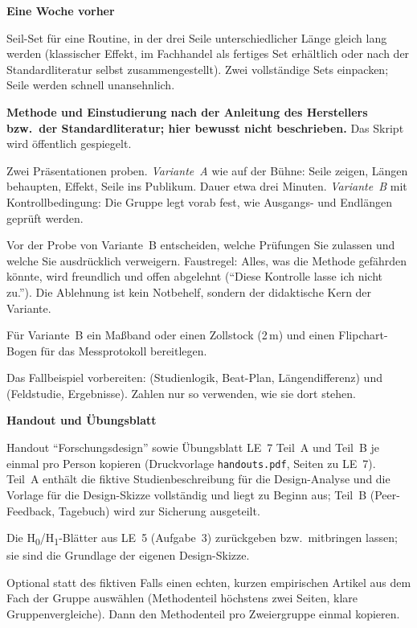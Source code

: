 \begin{vorbereitung}
\textbf{Eine Woche vorher}
\begin{checkliste}
  \item Seil-Set für eine Routine, in der drei Seile unterschiedlicher
    Länge gleich lang werden (klassischer Effekt, im Fachhandel als
    fertiges Set erhältlich oder nach der Standardliteratur selbst
    zusammengestellt). Zwei vollständige Sets einpacken; Seile werden
    schnell unansehnlich.
  \item \textbf{Methode und Einstudierung nach der Anleitung des
    Herstellers bzw.\ der Standardliteratur; hier bewusst nicht
    beschrieben.} Das Skript wird öffentlich gespiegelt.
  \item Zwei Präsentationen proben. \emph{Variante~A} wie auf der Bühne:
    Seile zeigen, Längen behaupten, Effekt, Seile ins Publikum. Dauer etwa
    drei Minuten. \emph{Variante~B} mit Kontrollbedingung: Die Gruppe legt
    vorab fest, wie Ausgangs- und Endlängen geprüft werden.
  \item Vor der Probe von Variante~B entscheiden, welche Prüfungen Sie
    zulassen und welche Sie ausdrücklich verweigern. Faustregel: Alles,
    was die Methode gefährden könnte, wird freundlich und offen abgelehnt
    (\enquote{Diese Kontrolle lasse ich nicht zu.}). Die Ablehnung ist kein
    Notbehelf, sondern der didaktische Kern der Variante.
  \item Für Variante~B ein Maßband oder einen Zollstock (2\,m) und einen
    Flipchart-Bogen für das Messprotokoll bereitlegen.
  \item Das Fallbeispiel vorbereiten:  (Studienlogik,
    Beat-Plan, Längendifferenz) und  (Feldstudie,
    Ergebnisse). Zahlen nur so verwenden, wie sie dort stehen.
\end{checkliste}

\textbf{Handout und Übungsblatt}
\begin{checkliste}
  \item Handout \enquote{Forschungsdesign} sowie Übungsblatt LE~7 Teil~A
    und Teil~B je einmal pro Person kopieren (Druckvorlage
    \texttt{handouts.pdf}, Seiten zu LE~7). Teil~A enthält die fiktive
    Studienbeschreibung für die Design-Analyse und die Vorlage für die
    Design-Skizze vollständig und liegt zu Beginn aus; Teil~B
    (Peer-Feedback, Tagebuch) wird zur Sicherung ausgeteilt.
  \item Die H\textsubscript{0}/H\textsubscript{1}-Blätter aus LE~5
    (Aufgabe~3) zurückgeben bzw.\ mitbringen lassen; sie sind die
    Grundlage der eigenen Design-Skizze.
  \item Optional statt des fiktiven Falls einen echten, kurzen
    empirischen Artikel aus dem Fach der Gruppe auswählen (Methodenteil
    höchstens zwei Seiten, klare Gruppenvergleiche). Dann den
    Methodenteil pro Zweiergruppe einmal kopieren.
\end{checkliste}


\end{vorbereitung}
